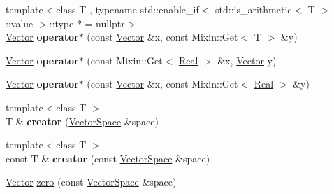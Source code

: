 \begin{DoxyCompactItemize}
\item 
\hypertarget{namespaceSpacy_a6656b636307ec4d5552477027b724f46}{{\footnotesize template$<$class T , typename std\-::enable\-\_\-if$<$ std\-::is\-\_\-arithmetic$<$ T $>$\-::value $>$\-::type $\ast$  = nullptr$>$ }\\\hyperlink{classSpacy_1_1Vector}{\-Vector} {\bfseries operator$\ast$} (const \hyperlink{classSpacy_1_1Vector}{\-Vector} \&x, const \-Mixin\-::\-Get$<$ \-T $>$ \&y)}\label{namespaceSpacy_a6656b636307ec4d5552477027b724f46}

\item 
\hypertarget{namespaceSpacy_a011c3af8fa33fc2da22f9667edaeba29}{\hyperlink{classSpacy_1_1Vector}{\-Vector} {\bfseries operator$\ast$} (const \-Mixin\-::\-Get$<$ \hyperlink{classSpacy_1_1Real}{\-Real} $>$ \&x, \hyperlink{classSpacy_1_1Vector}{\-Vector} y)}\label{namespaceSpacy_a011c3af8fa33fc2da22f9667edaeba29}

\item 
\hypertarget{namespaceSpacy_a7ad73bdbb0377bd088f1007894a4a824}{\hyperlink{classSpacy_1_1Vector}{\-Vector} {\bfseries operator$\ast$} (const \hyperlink{classSpacy_1_1Vector}{\-Vector} \&x, const \-Mixin\-::\-Get$<$ \hyperlink{classSpacy_1_1Real}{\-Real} $>$ \&y)}\label{namespaceSpacy_a7ad73bdbb0377bd088f1007894a4a824}

\item 
\hypertarget{namespaceSpacy_affaca762d59da675eef594854762cdcd}{{\footnotesize template$<$class T $>$ }\\\-T \& {\bfseries creator} (\hyperlink{classSpacy_1_1VectorSpace}{\-Vector\-Space} \&space)}\label{namespaceSpacy_affaca762d59da675eef594854762cdcd}

\item 
\hypertarget{namespaceSpacy_aed55e3a3401be0e74e174a12858baffa}{{\footnotesize template$<$class T $>$ }\\const \-T \& {\bfseries creator} (const \hyperlink{classSpacy_1_1VectorSpace}{\-Vector\-Space} \&space)}\label{namespaceSpacy_aed55e3a3401be0e74e174a12858baffa}

\item 
\hypertarget{namespaceSpacy_ac7f0661bfdb52144b9ff0b9bbdd81f69}{\hyperlink{classSpacy_1_1Vector}{\-Vector} \hyperlink{namespaceSpacy_ac7f0661bfdb52144b9ff0b9bbdd81f69}{zero} (const \hyperlink{classSpacy_1_1VectorSpace}{\-Vector\-Space} \&space)}\label{namespaceSpacy_ac7f0661bfdb52144b9ff0b9bbdd81f69}


\end{DoxyCompactItemize}
